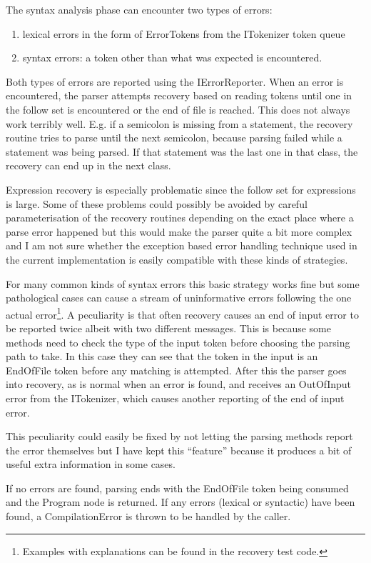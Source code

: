 \documentclass[a4paper,11pt]{article}
\begin{document}
The syntax analysis phase can encounter two types of errors:
\begin{enumerate}
\item lexical errors in the form of ErrorTokens from the ITokenizer token queue
\item syntax errors: a token other than what was expected is encountered.
\end{enumerate}

Both types of errors are reported using the IErrorReporter. When an error is encountered, the parser attempts recovery based on reading tokens until one in the follow set is encountered or the end of file is reached. This does not always work terribly well. E.g. if a semicolon is missing from a statement, the recovery routine tries to parse until the next semicolon, because parsing failed while a statement was being parsed. If that statement was the last one in that class, the recovery can end up in the next class.

Expression recovery is especially problematic since the follow set for expressions is large. Some of these problems could possibly be avoided by careful parameterisation of the recovery routines depending on the exact place where a parse error happened but this would make the parser quite a bit more complex and I am not sure whether the exception based error handling technique used in the current implementation is easily compatible with these kinds of strategies.

For many common kinds of syntax errors this basic strategy works fine but some pathological cases can cause a stream of uninformative errors following the one actual error\footnote{Examples with explanations can be found in the recovery test code.}. A peculiarity is that often recovery causes an end of input error to be reported twice albeit with two different messages. This is because some methods need to check the type of the input token before choosing the parsing path to take. In this case they can see that the token in the input is an EndOfFile token before any matching is attempted. After this the parser goes into recovery, as is normal when an error is found, and receives an OutOfInput error from the ITokenizer, which causes another reporting of the end of input error.

This peculiarity could easily be fixed by not letting the parsing methods report the error themselves but I have kept this ``feature'' because it produces a bit of useful extra information in some cases.

If no errors are found, parsing ends with the EndOfFile token being consumed and the Program node is returned. If any errors (lexical or syntactic) have been found, a CompilationError is thrown to be handled by the caller.
\end{document}
